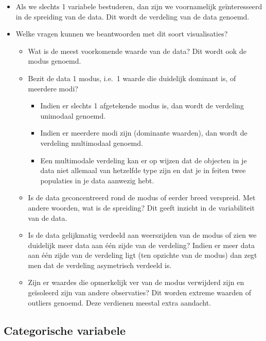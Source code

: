 \documentclass[]{tufte-book}
\providecommand{\tightlist}{%
  \setlength{\itemsep}{0pt}\setlength{\parskip}{0pt}}
\begin{document}
\begin{itemize}
\tightlist
\item
  Als we slechts 1 variabele bestuderen, dan zijn we voornamelijk geïnteresseerd in de spreiding van de data. Dit wordt de verdeling van de data genoemd.
\item
  Welke vragen kunnen we beantwoorden met dit soort visualisaties?

  \begin{itemize}
  \tightlist
  \item
    Wat is de meest voorkomende waarde van de data? Dit wordt ook de modus genoemd.
  \item
    Bezit de data 1 modus, i.e.~1 waarde die duidelijk dominant is, of meerdere modi?

    \begin{itemize}
    \tightlist
    \item
      Indien er slechts 1 afgetekende modus is, dan wordt de verdeling unimodaal genoemd.
    \item
      Indien er meerdere modi zijn (dominante waarden), dan wordt de verdeling multimodaal genoemd.
    \item
      Een multimodale verdeling kan er op wijzen dat de objecten in je data niet allemaal van hetzelfde type zijn en dat je in feiten twee populaties in je data aanwezig hebt.
    \end{itemize}
  \item
    Is de data geconcentreerd rond de modus of eerder breed verspreid. Met andere woorden, wat is de spreiding? Dit geeft inzicht in de variabiliteit van de data.
  \item
    Is de data gelijkmatig verdeeld aan weerszijden van de modus of zien we duidelijk meer data aan één zijde van de verdeling? Indien er meer data aan één zijde van de verdeling ligt (ten opzichte van de modus) dan zegt men dat de verdeling asymetrisch verdeeld is.
  \item
    Zijn er waardes die opmerkelijk ver van de modus verwijderd zijn en geïsoleerd zijn van andere observaties? Dit worden extreme waarden of outliers genoemd. Deze verdienen meestal extra aandacht.
  \end{itemize}
\end{itemize}

\hypertarget{categorische-variabele}{%
\subsection{Categorische variabele}\label{categorische-variabele}}
\end{document}
